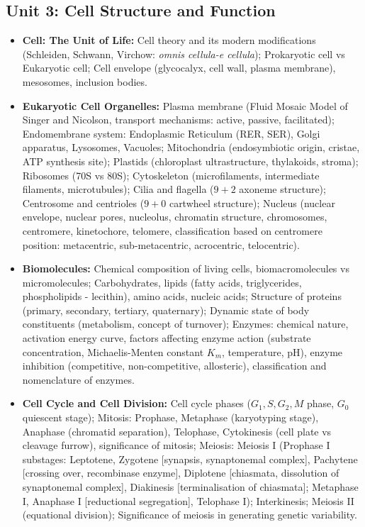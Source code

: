 \documentclass[11pt,a4paper]{article}
\begin{document}
\subsection{Unit 3: Cell Structure and Function}
\begin{itemize}
  \item \textbf{Cell: The Unit of Life:} Cell theory and its modern modifications (Schleiden, Schwann, Virchow: \textit{omnis cellula-e cellula}); Prokaryotic cell vs Eukaryotic cell; Cell envelope (glycocalyx, cell wall, plasma membrane), mesosomes, inclusion bodies.
  \item \textbf{Eukaryotic Cell Organelles:} Plasma membrane (Fluid Mosaic Model of Singer and Nicolson, transport mechanisms: active, passive, facilitated); Endomembrane system: Endoplasmic Reticulum (RER, SER), Golgi apparatus, Lysosomes, Vacuoles; Mitochondria (endosymbiotic origin, cristae, ATP synthesis site); Plastids (chloroplast ultrastructure, thylakoids, stroma); Ribosomes (70S vs 80S); Cytoskeleton (microfilaments, intermediate filaments, microtubules); Cilia and flagella ($9+2$ axoneme structure); Centrosome and centrioles ($9+0$ cartwheel structure); Nucleus (nuclear envelope, nuclear pores, nucleolus, chromatin structure, chromosomes, centromere, kinetochore, telomere, classification based on centromere position: metacentric, sub-metacentric, acrocentric, telocentric).
  \item \textbf{Biomolecules:} Chemical composition of living cells, biomacromolecules vs micromolecules; Carbohydrates, lipids (fatty acids, triglycerides, phospholipids - lecithin), amino acids, nucleic acids; Structure of proteins (primary, secondary, tertiary, quaternary); Dynamic state of body constituents (metabolism, concept of turnover); Enzymes: chemical nature, activation energy curve, factors affecting enzyme action (substrate concentration, Michaelis-Menten constant $K_m$, temperature, pH), enzyme inhibition (competitive, non-competitive, allosteric), classification and nomenclature of enzymes.
  \item \textbf{Cell Cycle and Cell Division:} Cell cycle phases ($G_1, S, G_2, M$ phase, $G_0$ quiescent stage); Mitosis: Prophase, Metaphase (karyotyping stage), Anaphase (chromatid separation), Telophase, Cytokinesis (cell plate vs cleavage furrow), significance of mitosis; Meiosis: Meiosis I (Prophase I substages: Leptotene, Zygotene [synapsis, synaptonemal complex], Pachytene [crossing over, recombinase enzyme], Diplotene [chiasmata, dissolution of synaptonemal complex], Diakinesis [terminalisation of chiasmata]; Metaphase I, Anaphase I [reductional segregation], Telophase I); Interkinesis; Meiosis II (equational division); Significance of meiosis in generating genetic variability.
\end{itemize}
\end{document}
